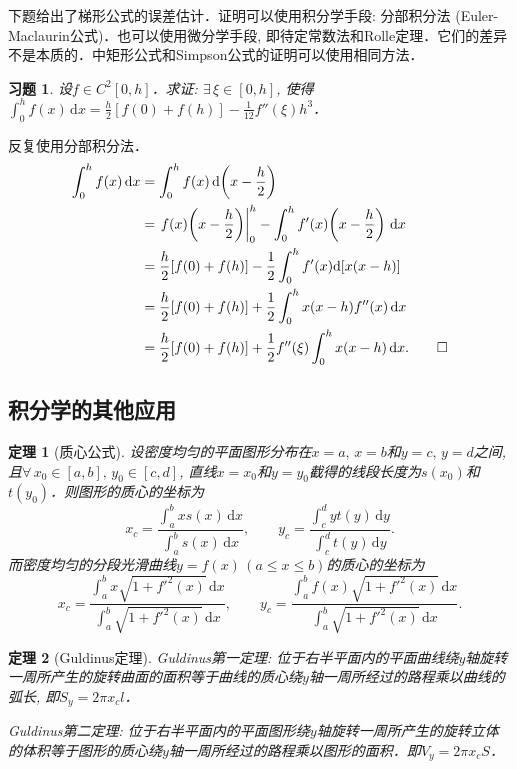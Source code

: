\documentclass[11pt,a4paper]{ctexart}
\makeatletter
\theoremstyle{thmseries} %
\newtheorem{thm}{定理}[section]
\theoremstyle{exerseries}
\newtheorem{exer}{习题}[section]
\renewenvironment{proof}[1][\proofname]{\par
  \pushQED{\qed}%
  \normalfont \topsep6\p@\@plus6\p@\relax
  \trivlist
  \item[\hskip\labelsep
        \itshape
    #1\@addpunct{}]\ignorespaces
}{%
  \popQED\endtrivlist\@endpefalse
}
\newenvironment{pf}{\begin{proof}[\bfseries\upshape 证\quad]}{\end{proof}}
\newcommand{\bra}[1]{\mathopen{}\left(#1\right)}
\renewcommand{\d}{\mathrm{d}}
\makeatother
\begin{document}
下题给出了梯形公式的误差估计．证明可以使用积分学手段: 分部积分法 (Euler-Maclaurin公式)．也可以使用微分学手段, 即待定常数法和Rolle定理．它们的差异不是本质的．中矩形公式和Simpson公式的证明可以使用相同方法．
\begin{exer}
	设$f\in C^2[0,h]$．求证: $\exists\,\xi\in[0,h]$, 使得$\int_{0}^{h}f(x)\,\d x=\frac{h}{2}[f(0)+f(h)]-\frac{1}{12}f''(\xi)h^3$．
\end{exer}
\begin{pf}
	反复使用分部积分法．
	\begin{align*}
		\int_{0}^{h}f(x)\,\d x&=\int_{0}^{h}f(x)\,\d\bra{x-\frac{h}{2}}\\
		&=\left.f(x)\bra{x-\frac{h}{2}}\right|_0^h-\int_{0}^{h}f'(x)\bra{x-\frac{h}{2}}\,\d x\\
		&=\frac{h}{2}[f(0)+f(h)]-\frac{1}{2}\int_{0}^{h}f'(x)\d[x(x-h)]\\
		&=\frac{h}{2}[f(0)+f(h)]+\frac{1}{2}\int_{0}^{h}x(x-h)f''(x)\,\d x\\
		&=\frac{h}{2}[f(0)+f(h)]+\frac{1}{2}f''(\xi)\int_{0}^{h}x(x-h)\,\d x.\qedhere
	\end{align*}
\end{pf}


\subsection{积分学的其他应用}
\begin{thm}[质心公式]
	设密度均匀的平面图形分布在$x=a,\,x=b$和$y=c,\,y=d$之间, 且$\forall\,x_0\in[a,b],\,y_0\in[c,d]$, 直线$x=x_0$和$y=y_0$截得的线段长度为$s(x_0)$和$t(y_0)$．则图形的质心的坐标为
	\[x_c=\frac{\int_{a}^{b}xs(x)\,\d x}{\int_{a}^{b}s(x)\,\d x},\qquad y_c=\frac{\int_{c}^{d}yt(y)\,\d y}{\int_{c}^{d}t(y)\,\d y}.\]
	而密度均匀的分段光滑曲线$y=f(x)\,(a\leq x\leq b)$的质心的坐标为
	\[x_c=\frac{\int_{a}^{b}x\sqrt{1+f'^2(x)}\,\d x}{\int_{a}^{b}\sqrt{1+f'^2(x)}\,\d x},\qquad y_c=\frac{\int_{a}^{b}f(x)\sqrt{1+f'^2(x)}\,\d x}{\int_{a}^{b}\sqrt{1+f'^2(x)}\,\d x}.\]
\end{thm}

\begin{thm}[Guldinus定理]
	\phantom{text}

	Guldinus第一定理: 位于右半平面内的平面曲线绕$y$轴旋转一周所产生的旋转曲面的面积等于曲线的质心绕$y$轴一周所经过的路程乘以曲线的弧长, 即$S_y=2\pi x_cl$．

	Guldinus第二定理: 位于右半平面内的平面图形绕$y$轴旋转一周所产生的旋转立体的体积等于图形的质心绕$y$轴一周所经过的路程乘以图形的面积．即$V_y=2\pi x_cS$．
\end{thm}
\end{document}
